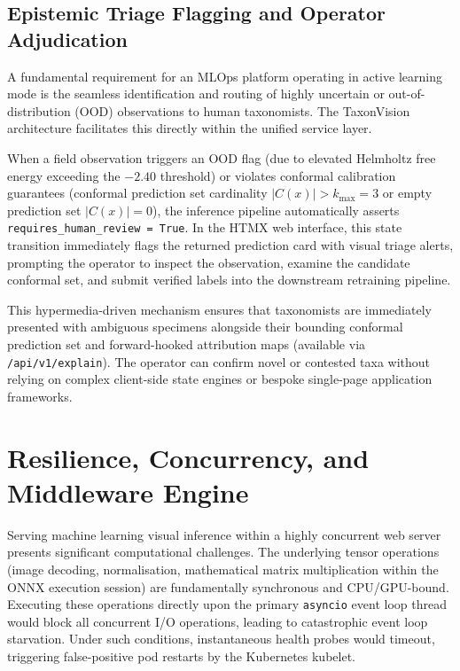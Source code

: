 \subsection{Epistemic Triage Flagging and Operator Adjudication}

A fundamental requirement for an MLOps platform operating in active learning mode is the seamless identification and routing of highly uncertain or out-of-distribution (OOD) observations to human taxonomists. The TaxonVision architecture facilitates this directly within the unified service layer.

When a field observation triggers an OOD flag (due to elevated Helmholtz free energy exceeding the $-2.40$ threshold) or violates conformal calibration guarantees (conformal prediction set cardinality $|C(x)| > k_{\text{max}} = 3$ or empty prediction set $|C(x)| = 0$), the inference pipeline automatically asserts \texttt{requires\_human\_review = True}. In the HTMX web interface, this state transition immediately flags the returned prediction card with visual triage alerts, prompting the operator to inspect the observation, examine the candidate conformal set, and submit verified labels into the downstream retraining pipeline.

This hypermedia-driven mechanism ensures that taxonomists are immediately presented with ambiguous specimens alongside their bounding conformal prediction set and forward-hooked attribution maps (available via \texttt{/api/v1/explain}). The operator can confirm novel or contested taxa without relying on complex client-side state engines or bespoke single-page application frameworks.

\section{Resilience, Concurrency, and Middleware Engine}
\label{sec:resilience_concurrency_and_middleware}

Serving machine learning visual inference within a highly concurrent web server presents significant computational challenges. The underlying tensor operations (image decoding, normalisation, mathematical matrix multiplication within the ONNX execution session) are fundamentally synchronous and CPU/GPU-bound. Executing these operations directly upon the primary \texttt{asyncio} event loop thread would block all concurrent I/O operations, leading to catastrophic event loop starvation. Under such conditions, instantaneous health probes would timeout, triggering false-positive pod restarts by the Kubernetes kubelet.


